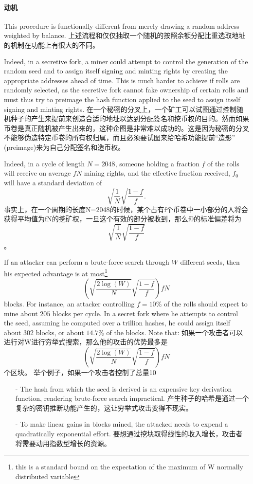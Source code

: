 \documentclass[letterpaper]{article}
\begin{document}
\paragraph{动机}
This procedure is functionally different from merely drawing a random address
weighted by balance.
上述流程和仅仅抽取一个随机的按照余额分配比重选取地址的机制在功能上有很大的不同。

Indeed, in a secretive fork, a miner could attempt to control the generation of
the random seed and to assign itself signing and minting rights by creating the
appropriate addresses ahead of time. This is much harder to achieve if rolls
are randomly selected, as the secretive fork cannot fake ownership of certain
rolls and must thus try to preimage the hash function applied to the seed to
assign itself signing and minting rights. 
在一个秘密的分叉上，一个矿工可以试图通过控制随机种子的产生来提前来创造合适的地址以达到分配签名和挖币权的目的。然而如果币卷是真正随机被产生出来的，这种企图是非常难以成功的。这是因为秘密的分叉不能够伪造特定币卷的所有权归属，而且必须要试图来给哈希功能提前“造影” (preimage)来为自己分配签名和造币权。

Indeed, in a cycle of length $N=\num{2048}$, someone holding a fraction $f$ of
the rolls will receive on average $f N$ mining rights, and the effective
fraction received, $f_0$ will have a standard deviation of
$$\sqrt{\frac{1}{N}}\sqrt{\frac{1-f}{f}}.$$
事实上，在一个周期的长度N=2048的时候，某个占有f个币卷中一小部分的人将会获得平均值为fN的挖矿权，一旦这个有效的部分被收到，那么f0的标准偏差将为$$\sqrt{\frac{1}{N}}\sqrt{\frac{1-f}{f}}$$。

If an attacker can perform a brute-force search through $W$ different seeds,
then his expected advantage is at most\footnote{this is a standard bound
on the expectation of the maximum of W normally distributed variable}
$$\left(\sqrt{\frac{2\log(W)}{N}}\sqrt{\frac{1-f}{f}}\right)fN$$
blocks. For instance, an attacker controlling $f = 10\%$ of the rolls should
expect  to mine about $205$ blocks per cycle. In a secret fork where he attempts
to control the seed, assuming he computed over a trillion hashes, he could
assign itself about $302$ blocks, or about $14.7\%$ of the blocks. Note that:
如果一个攻击者可以进行对W进行穷举式搜索，那么他的攻击的优势最多是$$\left(\sqrt{\frac{2\log(W)}{N}}\sqrt{\frac{1-f}{f}}\right)fN$$个区块。
举个例子，如果一个攻击者控制了总量10%
\begin{itemize}
\item[-] The hash from which the seed is derived is an expensive key derivation
function, rendering brute-force search impractical.
产生种子的哈希是通过一个复杂的密钥推断功能产生的，这让穷举式攻击变得不现实。
\item[-] To make linear gains in blocks mined, the attacked needs to expend a
quadratically exponential effort.
要想通过挖块取得线性的收入增长，攻击者将需要动用指数型增长的资源。
\end{itemize}  
\end{document}

